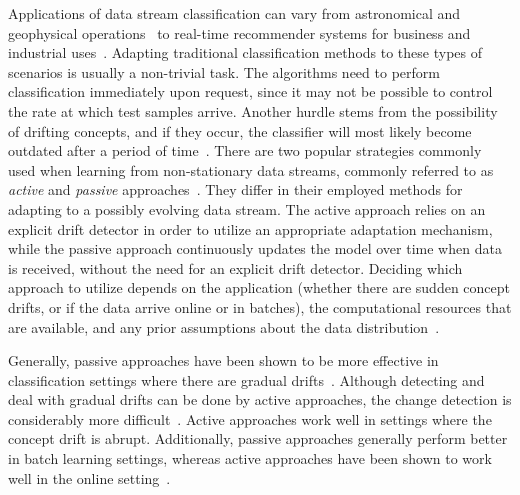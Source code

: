 \documentclass[reqno]{vcuthesis}
\numberwithin{equation}{chapter}
\begin{document}
Applications of data stream classification can vary from astronomical and geophysical operations~\cite{burl1999diamond} to real-time recommender systems for business and industrial uses~\cite{kargupta2002mobimine,kargupta2004vedas}. Adapting traditional classification methods to these types of scenarios is usually a non-trivial task. The algorithms need to perform classification immediately upon request, since it may not be possible to control the rate at which test samples arrive. Another hurdle stems from the possibility of drifting concepts, and if they occur, the classifier will most likely become outdated after a period of time~\cite{gama2014survey}. There are two popular strategies commonly used when learning from non-stationary data streams, commonly referred to as \textit{active} and \textit{passive} approaches~\cite{ditzler2015learning,elwell2011incremental}. They differ in their employed methods for adapting to a possibly evolving data stream. The active approach relies on an explicit drift detector in order to utilize an appropriate adaptation mechanism, while the passive approach continuously updates the model over time when data is received, without the need for an explicit drift detector. Deciding which approach to utilize depends on the application (whether there are sudden concept drifts, or if the data arrive online or in batches), the computational resources that are available, and any prior assumptions about the data distribution~\cite{alippi2014intelligence}. 

Generally, passive approaches have been shown to be more effective in classification settings where there are gradual drifts~\cite{elwell2011incremental}. Although detecting and deal with gradual drifts can be done by active approaches, the change detection is considerably more difficult~\cite{alippi2009just}. Active approaches work well in settings where the concept drift is abrupt. Additionally, passive approaches generally perform better in batch learning settings, whereas active approaches have been shown to work well in the online setting~\cite{bifet2007learning,gama2004learning}.
\end{document}
